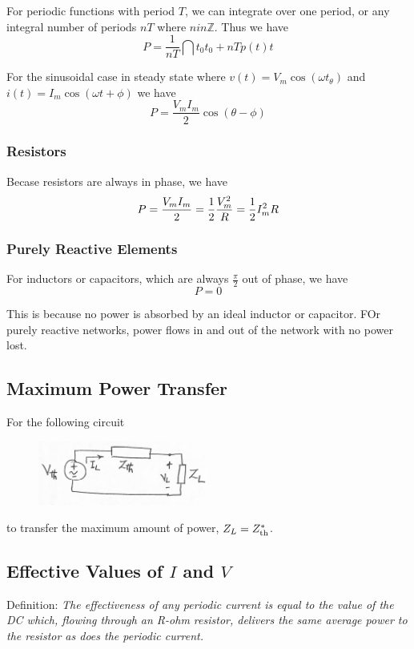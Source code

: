 \documentclass[12pt]{article}
\begin{document}
For periodic functions with period $T$, we can integrate over one period, or any integral number of periods $nT$ where $n in \mathbb{Z}$. Thus we have \[ P = \frac{1}{nT} \dint{t_0}{t_0+nT}{p(t)}{t} \]

For the sinusoidal case in steady state where $v(t) = V_m\cos(\omega t _ \theta)$ and $i(t) = I_m\cos(\omega t + \phi)$ we have \[ P = \frac{V_mI_m}{2}\cos(\theta - \phi) \]

\subsubsection*{Resistors}
Becase resistors are always in phase, we have \[ P = \frac{V_mI_m}{2} = \frac{1}{2} \frac{V_m^2}{R} = \frac{1}{2} I_m^2R \]

\subsubsection*{Purely Reactive Elements}
For inductors or capacitors, which are always $\frac{\pi}{2}$ out of phase, we have \[ P = 0 \]

This is because no power is absorbed by an ideal inductor or capacitor. FOr purely reactive networks, power flows in and out of the network with no power lost.

\newpage
\subsection*{Maximum Power Transfer}
For the following circuit
\begin{figure}[ht]
\centering
\includegraphics[width=0.5\textwidth]{impedance.png}
\end{figure}

to transfer the maximum amount of power, $Z_L = Z_{{\rm th}}^*$.

\subsection*{Effective Values of $I$ and $V$}
Definition: \textit{The effectiveness of any periodic current is equal to the value of the DC which, flowing through an R-ohm resistor, delivers the same average power to the resistor as does the periodic current.}
\end{document}
